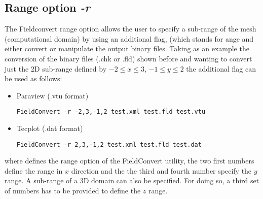 \subsection{Range option \textit{-r}}
The Fieldconvert range option  allows the user to specify 
a sub-range of the mesh (computational domain) by using an 
additional flag,  (which stands for ange and either 
convert or manipulate the \nekpp output binary files. 
Taking as an example the conversion of the \nekpp binary files 
(.chk or .fld) shown before and wanting to convert just the 2D 
sub-range defined by $-2\leq x \leq 3$, $-1\leq y \leq 2$ the 
additional flag  can be used as follows:
%
\begin{itemize}
\item Paraview (.vtu format)
%
\begin{lstlisting}[style=BashInputStyle]
FieldConvert -r -2,3,-1,2 test.xml test.fld test.vtu
\end{lstlisting}
%
\item Tecplot (.dat format)
%
\begin{lstlisting}[style=BashInputStyle]
FieldConvert -r 2,3,-1,2 test.xml test.fld test.dat
\end{lstlisting}
%
\end{itemize}
where  defines the range option of the FieldConvert
utility, the two first numbers define the range in $x$ direction 
and the the third and fourth number specify the $y$ range.
A sub-range of a 3D domain can also be specified. 
For doing so, a third set of numbers has to be provided 
to define the $z$ range.
%
%
%
